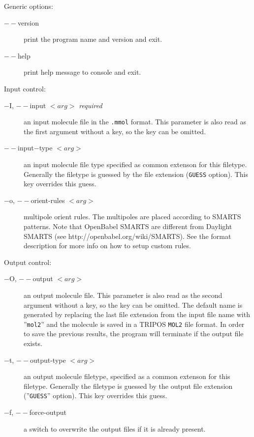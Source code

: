\documentclass[10pt,a4paper]{article}
\begin{document}
Generic options:
\begin{description}
\item[$--$version] print the program name and version and exit.
\item[$--$help] print help message to console and exit.
\end{description}

Input control:
\begin{description}
\item[$-$I, $--$input $<arg>$ \textit{required}] an input molecule file in 
the \lstinline{.mmol} format. This parameter is also read as the first argument without 
a key, so the key can be omitted.
\item[$--$input$-$type $<arg>$] an input molecule file type specified as common extenson
for this filetype. Generally the filetype is guessed by the file extension 
(\lstinline{GUESS} option). This key overrides this guess.
\item[$-$o, $--$orient-rules $<arg>$] multipole orient rules. The multipoles are placed
according to SMARTS patterns. Note that OpenBabel SMARTS are 
different from Daylight SMARTS (see http://openbabel.org/wiki/SMARTS). See the format
description for more info on how to setup custom rules.
\end{description}

Output control:
\begin{description}
\item[$-$O, $--$output $<arg>$] an output molecule file. This parameter is also read as the
second argument without a key, so the key can be omitted. The default name is generated by
replacing the last file extension from the input file name with ''\lstinline{mol2}'' 
and the molecule is
saved in a TRIPOS \lstinline{MOL2} file format. In order to save the previous results, 
the program will terminate if the output file exists.
\item[$-$t, $--$output-type $<arg>$] an output molecule filetype, specified as a common 
extenson for this filetype. Generally the filetype is guessed by the output file extension 
(''\lstinline{GUESS}'' option). This key overrides this guess.
\item[$-$f, $--$force-output] a switch to overwrite the output files if it is
already present.
\end{description}
\end{document}
